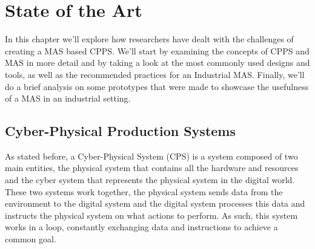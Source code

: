 

\chapter{State of the Art}
\label{cha:state-of-the-art}

In this chapter we'll explore how researchers have dealt with the challenges of creating a MAS based CPPS. We'll start by  examining the concepts of CPPS and MAS in more detail and by taking a look at the most commonly used designs and tools, as well as the recommended practices for an Industrial MAS. Finally, we'll do a brief analysis on some prototypes that were made to showcase the usefulness of a MAS in an industrial setting.

\section{Cyber-Physical Production Systems}
\label{sec:cyber-physical_production_systems}

As stated before, a Cyber-Physical System (CPS) is a system composed of two main entities, the physical system that contains all the hardware and resources and the cyber system that represents the physical system in the digital world. These two systems work together, the physical system sends data from the environment to the digital system and the digital system processes this data and instructs the physical system on what actions to perform. As such, this system works in a loop, constantly exchanging data and instructions to achieve a common goal.\\

